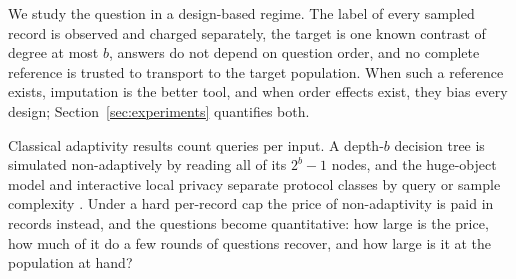 \documentclass{article}
\begin{document}
We study the question in a design-based regime. The label of every sampled record is observed and charged separately, the target is one known contrast of degree at most $b$, answers do not depend on question order, and no complete reference is trusted to transport to the target population. When such a reference exists, imputation is the better tool, and when order effects exist, they bias every design; Section~\ref{sec:experiments} quantifies both.

Classical adaptivity results count queries per input. A depth-$b$ decision tree is simulated non-adaptively by reading all of its $2^b-1$ nodes, and the huge-object model and interactive local privacy separate protocol classes by query or sample complexity \citep{goldreich2022,adar2024,joseph2019,joseph2020}. Under a hard per-record cap the price of non-adaptivity is paid in records instead, and the questions become quantitative: how large is the price, how much of it do a few rounds of questions recover, and how large is it at the population at hand?
\end{document}
